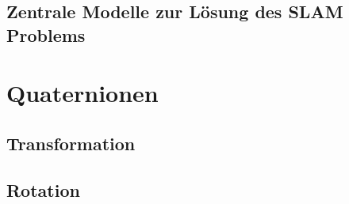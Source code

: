 \subsection{Zentrale Modelle zur Lösung des SLAM Problems}

\section{Quaternionen}
\label{chap:Quaternionen}





\subsection{Transformation}
\subsection{Rotation}

